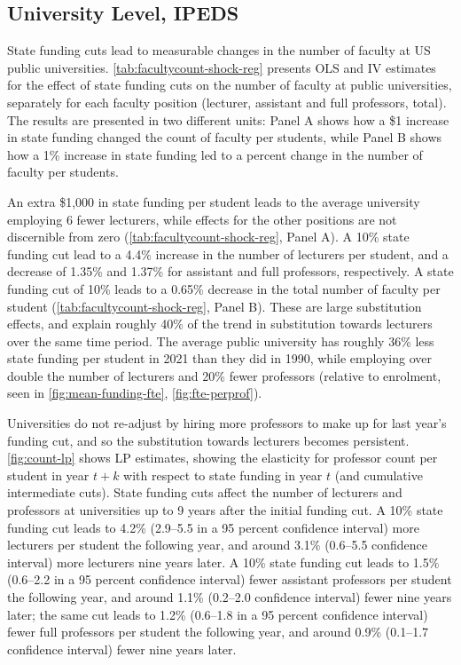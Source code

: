 \subsection{University Level, IPEDS}
\label{sec:results-ipeds}
State funding cuts lead to measurable changes in the number of faculty at US public universities.
\autoref{tab:facultycount-shock-reg} presents OLS and IV estimates for the effect of state funding cuts on the number of faculty at public universities, separately for each faculty position (lecturer, assistant and full professors, total).
The results are presented in two different units: Panel A shows how a \$1 increase in state funding changed the count of faculty per students, while Panel B shows how a 1\% increase in state funding led to a percent change in the number of faculty per students.

An extra \$1,000 in state funding per student leads to the average university employing 6 fewer lecturers, while effects for the other positions are not discernible from zero (\autoref{tab:facultycount-shock-reg}, Panel A).
A 10\% state funding cut lead to a 4.4\% increase in the number of lecturers per student, and a decrease of 1.35\% and 1.37\% for assistant and full professors, respectively.
A state funding cut of 10\% leads to a 0.65\% decrease in the total number of faculty per student (\autoref{tab:facultycount-shock-reg}, Panel B).
These are large substitution effects, and explain roughly 40\% of the trend in substitution towards lecturers over the same time period.
The average public university has roughly 36\% less state funding per student in 2021 than they did in 1990, while employing over double the number of lecturers and 20\% fewer professors (relative to enrolment, seen in \autoref{fig:mean-funding-fte}, \ref{fig:fte-perprof}).

Universities do not re-adjust by hiring more professors to make up for last year's funding cut, and so the substitution towards lecturers becomes persistent.
\autoref{fig:count-lp} shows LP estimates, showing the elasticity for professor count per student in year $t+k$ with respect to state funding in year $t$ (and cumulative intermediate cuts).
State funding cuts affect the number of lecturers and professors at universities up to 9 years after the initial funding cut.
A 10\% state funding cut leads to 4.2\% (2.9--5.5 in a 95 percent confidence interval) more lecturers per student the following year, and around 3.1\% (0.6--5.5 confidence interval) more lecturers nine years later.
A 10\% state funding cut leads to 1.5\% (0.6--2.2 in a 95 percent confidence interval) fewer assistant professors per student the following year, and around 1.1\% (0.2--2.0 confidence interval) fewer nine years later;
the same cut leads to 1.2\% (0.6--1.8 in a 95 percent confidence interval) fewer full professors per student the following year, and around 0.9\% (0.1--1.7 confidence interval) fewer nine years later.


